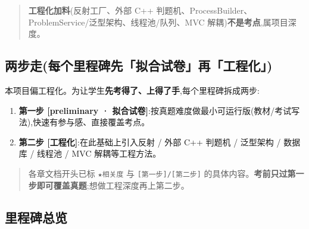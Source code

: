 \documentclass[
  11pt,
]{ctexart}
\providecommand{\tightlist}{%
  \setlength{\itemsep}{0pt}\setlength{\parskip}{0pt}}
\begin{document}
\begin{quote}
\textbf{工程化加料}(反射工厂、外部 C++
判题机、ProcessBuilder、ProblemService/泛型架构、线程池/队列、MVC
解耦)\textbf{不是考点},属项目深度。
\end{quote}

\hypertarget{ux4e24ux6b65ux8d70ux6bcfux4e2aux91ccux7a0bux7891ux5148ux62dfux5408ux8bd5ux5377ux518dux5de5ux7a0bux5316}{%
\subsection{两步走(每个里程碑先「拟合试卷」再「工程化」)}\label{ux4e24ux6b65ux8d70ux6bcfux4e2aux91ccux7a0bux7891ux5148ux62dfux5408ux8bd5ux5377ux518dux5de5ux7a0bux5316}}

本项目偏工程化。为让学生\textbf{先考得了、上得了手},每个里程碑拆成两步:

\begin{enumerate}
\def\labelenumi{\arabic{enumi}.}
\tightlist
\item
  \textbf{第一步 {[}preliminary ·
  拟合试卷{]}}:按真题难度做最小可运行版(教材/考试写法),快速有参与感、直接覆盖考点。
\item
  \textbf{第二步 {[}工程化{]}}:在此基础上引入反射 / 外部 C++ 判题机 /
  泛型架构 / 数据库 / 线程池 / MVC 解耦等工程方法。
\end{enumerate}

\begin{quote}
各章文档开头已标 \texttt{★相关度} 与 \texttt{{[}第一步{]}/{[}第二步{]}}
的具体内容。\textbf{考前只过第一步即可覆盖真题};想做工程深度再上第二步。
\end{quote}

\hypertarget{ux91ccux7a0bux7891ux603bux89c8}{%
\subsection{里程碑总览}\label{ux91ccux7a0bux7891ux603bux89c8}}
\end{document}
